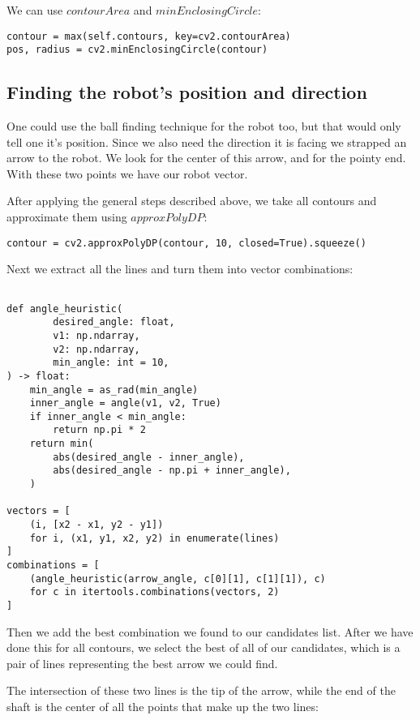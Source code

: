 \documentclass[12pt, a4paper]{article}
\begin{document}
We can use $contourArea$ and $minEnclosingCircle$:

\begin{lstlisting}
contour = max(self.contours, key=cv2.contourArea)
pos, radius = cv2.minEnclosingCircle(contour)
\end{lstlisting}

\subsection{Finding the robot's position and direction}
One could use the ball finding technique for the robot too, but that would only tell one it's position. Since we also need the direction it is facing we strapped an arrow to the robot. We look for the center of this arrow, and for the pointy end. With these two points we have our robot vector.

After applying the general steps described above, we take all contours and approximate them using $approxPolyDP$:

\begin{lstlisting}
contour = cv2.approxPolyDP(contour, 10, closed=True).squeeze()
\end{lstlisting}

Next we extract all the lines and turn them into vector combinations:

\begin{lstlisting}

def angle_heuristic(
        desired_angle: float,
        v1: np.ndarray,
        v2: np.ndarray,
        min_angle: int = 10,
) -> float:
    min_angle = as_rad(min_angle)
    inner_angle = angle(v1, v2, True)
    if inner_angle < min_angle:
        return np.pi * 2
    return min(
        abs(desired_angle - inner_angle),
        abs(desired_angle - np.pi + inner_angle),
    )

vectors = [
    (i, [x2 - x1, y2 - y1])
    for i, (x1, y1, x2, y2) in enumerate(lines)
]
combinations = [
    (angle_heuristic(arrow_angle, c[0][1], c[1][1]), c)
    for c in itertools.combinations(vectors, 2)
]
\end{lstlisting}

Then we add the best combination we found to our candidates list. After we have done this for all contours, we select the best of all of our candidates, which is a pair of lines representing the best arrow we could find.

The intersection of these two lines is the tip of the arrow, while the end of the shaft is the center of all the points that make up the two lines:
\end{document}
